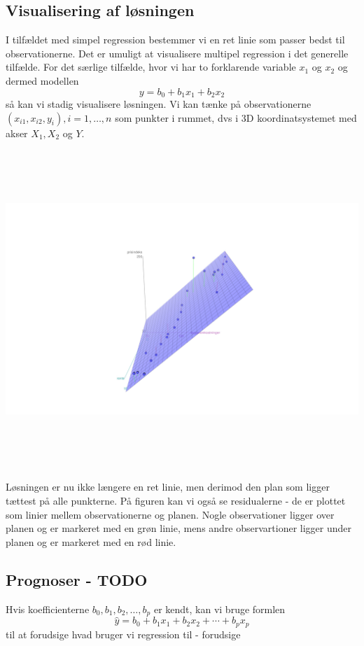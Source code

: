 \subsection{Visualisering af løsningen}
I tilfældet med simpel regression bestemmer vi en ret linie som passer bedst til observationerne. Det er umuligt at visualisere multipel regression i det generelle tilfælde. For det særlige tilfælde, hvor vi har to forklarende variable \(x_1\) og \(x_2\) og dermed modellen
\begin{displaymath}
  y = b_0 + b_1 x_1 + b_2 x_2
\end{displaymath}
så kan vi stadig visualisere løsningen. Vi kan tænke på observationerne \((x_{i1}, x_{i2}, y_i), i=1,\ldots,n\) som punkter i rummet, dvs i 3D koordinatsystemet med akser \(X_1, X_2\) og \(Y\).
\begin{center}
\includegraphics[height=12cm]{regression/images/visualisering.JPG}
\end{center}
Løsningen er nu ikke længere en ret linie, men derimod den plan som ligger tættest på alle punkterne. På figuren kan vi også se residualerne - de er plottet som linier mellem observationerne og planen. Nogle observationer ligger over planen og er markeret med en grøn linie, mens andre observartioner ligger under planen og er markeret med en rød linie.

\subsection{Prognoser - TODO}
Hvis koefficienterne \(b_0,b_1,b_2,\ldots,b_p\) er kendt, kan vi bruge formlen
\begin{displaymath}
\hat{y} = b_0 + b_1 x_1 + b_2 x_2 + \cdots + b_p x_p
\end{displaymath}
til at forudsige
hvad bruger vi regression til - forudsige

